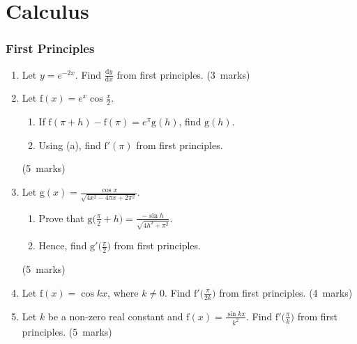 \documentclass[12pt, a4paper]{article} %
\newcommand{\qmarks}[1]{\leavevmode\unskip\hspace*{\fill}\mbox{(#1 marks)}}
\begin{document}
\newpage

\part{Calculus}

\section{First Principles}
\begin{enumerate}
    \item
    Let \(\displaystyle y=e^{-2x}\). Find \(\displaystyle \frac{\mathrm{d}y}{\mathrm{d}x}\) from first principles. 
    \qmarks{3}
    \item Let \(\displaystyle \mathrm{f}(x)=e^x\cos{\frac{x}{2}}\).
    \begin{enumerate}
        \item If \(\displaystyle \mathrm{f}(\pi+h)-\mathrm{f}(\pi)=e^{\pi}\mathrm{g}(h)\), find \(\mathrm{g}(h)\).
        \item Using (a), find \(\mathrm{f}'(\pi)\) from first principles.
    \end{enumerate} \qmarks{5}

    \item Let \(\displaystyle \mathrm{g}(x)=\frac{\cos x}{\sqrt{4x^2-4\pi x+2\pi^2}}\).
    \begin{enumerate}
        \item Prove that \(\displaystyle \mathrm{g}\bigg(\frac{\pi}{2}+h\bigg)=\frac{-\sin{h}}{\sqrt{4h^2+\pi^2}}\).
        \item Hence, find \(\displaystyle \mathrm{g}'\bigg(\frac{\pi}{2}\bigg)\) from first principles.
    \end{enumerate} \qmarks{5}

    \item Let \(\displaystyle \mathrm{f}(x)=\cos kx\), where \(k \neq 0\). Find \(\displaystyle \mathrm{f}'\bigg(\frac{\pi}{2k}\bigg)\) from first principles. \qmarks{4}

    \item Let \(k\) be a non-zero real constant and \(\displaystyle \mathrm{f}(x)=\frac{\sin kx}{k^2}\). Find \(\displaystyle \mathrm{f}'\bigg(\frac{\pi}{k}\bigg)\) from first principles. \qmarks{5}
    
\end{enumerate}
\newpage
\end{document}
